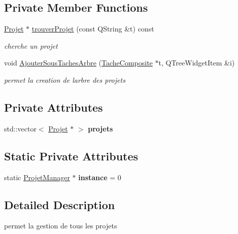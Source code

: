\subsection*{Private Member Functions}
\begin{DoxyCompactItemize}
\item 
\hyperlink{class_projet}{Projet} $\ast$ \hyperlink{class_projet_manager_a1e76111b8ecc4b380b92b04c00615885}{trouver\+Projet} (const Q\+String \&t) const 
\begin{DoxyCompactList}\small\item\em cherche un projet \end{DoxyCompactList}\item 
void \hyperlink{class_projet_manager_a2acde1e0f205d0fc990e0740b412c1fa}{Ajouter\+Sous\+Taches\+Arbre} (\hyperlink{class_tache_composite}{Tache\+Composite} $\ast$t, Q\+Tree\+Widget\+Item \&i)
\begin{DoxyCompactList}\small\item\em permet la creation de l\textquotesingle{}arbre des projets \end{DoxyCompactList}\end{DoxyCompactItemize}
\subsection*{Private Attributes}
\begin{DoxyCompactItemize}
\item 
\hypertarget{class_projet_manager_a634dad7bcef1aef9fbd15679336f8559}{}std\+::vector$<$ \hyperlink{class_projet}{Projet} $\ast$ $>$ {\bfseries projets}\label{class_projet_manager_a634dad7bcef1aef9fbd15679336f8559}

\end{DoxyCompactItemize}
\subsection*{Static Private Attributes}
\begin{DoxyCompactItemize}
\item 
\hypertarget{class_projet_manager_a11cde5b59fcb4870c618c53ee3ab55dc}{}static \hyperlink{class_projet_manager}{Projet\+Manager} $\ast$ {\bfseries instance} = 0\label{class_projet_manager_a11cde5b59fcb4870c618c53ee3ab55dc}

\end{DoxyCompactItemize}


\subsection{Detailed Description}
permet la gestion de tous les projets 

